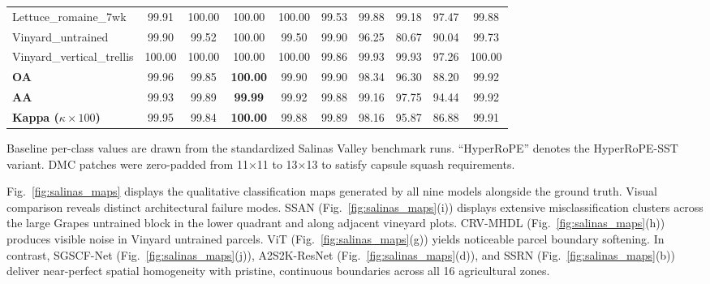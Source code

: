 \documentclass[manuscript,screen,review]{acmart}
\begin{document}
\begin{table}[tbp]
\begin{tabular}{p{2.9cm}ccccccccc}
Lettuce\_romaine\_7wk      & 99.91 & 100.00 & 100.00 & 100.00 & 99.53 & 99.88 & 99.18 & 97.47 & 99.88 \\
Vinyard\_untrained         & 99.90 & 99.52 & 100.00 & 99.50 & 99.90 & 96.25 & 80.67 & 90.04 & 99.73 \\
Vinyard\_vertical\_trellis & 100.00 & 100.00 & 100.00 & 100.00 & 99.86 & 99.93 & 99.93 & 97.26 & 100.00 \\
\midrule
\textbf{OA}          & 99.96 & 99.85 & \textbf{100.00} & 99.90 & 99.90 & 98.34 & 96.30 & 88.20 & 99.92 \\
\textbf{AA}          & 99.93 & 99.89 & \textbf{99.99} & 99.92 & 99.88 & 99.16 & 97.75 & 94.44 & 99.92 \\
\textbf{Kappa ($\kappa\times100$)} & 99.95 & 99.84 & \textbf{100.00} & 99.88 & 99.89 & 98.16 & 95.87 & 86.88 & 99.91 \\
\bottomrule
\end{tabular}
\flushleft
\footnotesize{Baseline per-class values are drawn from the standardized Salinas Valley benchmark runs. ``HyperRoPE'' denotes the HyperRoPE-SST variant. DMC patches were zero-padded from 11$\times$11 to 13$\times$13 to satisfy capsule squash requirements.}
\end{table}

Fig.~\ref{fig:salinas_maps} displays the qualitative classification maps generated by all nine models alongside the ground truth. Visual comparison reveals distinct architectural failure modes. SSAN (Fig.~\ref{fig:salinas_maps}(i)) displays extensive misclassification clusters across the large Grapes untrained block in the lower quadrant and along adjacent vineyard plots. CRV-MHDL (Fig.~\ref{fig:salinas_maps}(h)) produces visible noise in Vinyard untrained parcels. ViT (Fig.~\ref{fig:salinas_maps}(g)) yields noticeable parcel boundary softening. In contrast, SGSCF-Net (Fig.~\ref{fig:salinas_maps}(j)), A2S2K-ResNet (Fig.~\ref{fig:salinas_maps}(d)), and SSRN (Fig.~\ref{fig:salinas_maps}(b)) deliver near-perfect spatial homogeneity with pristine, continuous boundaries across all 16 agricultural zones.
\end{document}
